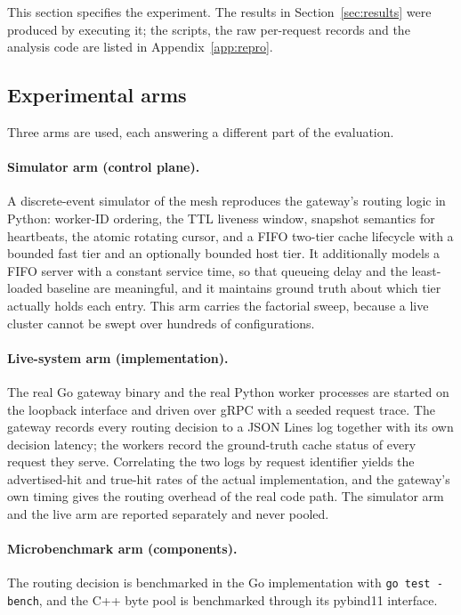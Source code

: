 \documentclass[10pt,twocolumn]{article}
\begin{document}
This section specifies the experiment. The results in
Section~\ref{sec:results} were produced by executing it; the scripts, the
raw per-request records and the analysis code are listed in
Appendix~\ref{app:repro}.

\subsection{Experimental arms}

Three arms are used, each answering a different part of the evaluation.

\paragraph{Simulator arm (control plane).} A discrete-event simulator of the
mesh reproduces the gateway's routing logic in Python: worker-ID ordering, the
TTL liveness window, snapshot semantics for heartbeats, the atomic rotating
cursor, and a FIFO two-tier cache lifecycle with a bounded fast tier and an
optionally bounded host tier. It additionally models a FIFO server with a
constant service time, so that queueing delay and the least-loaded baseline
are meaningful, and it maintains ground truth about which tier actually holds
each entry. This arm carries the factorial sweep, because a live cluster
cannot be swept over hundreds of configurations.

\paragraph{Live-system arm (implementation).} The real Go gateway binary and
the real Python worker processes are started on the loopback interface and
driven over gRPC with a seeded request trace. The gateway records every
routing decision to a JSON Lines log together with its own decision latency;
the workers record the ground-truth cache status of every request they serve.
Correlating the two logs by request identifier yields the advertised-hit and
true-hit rates of the actual implementation, and the gateway's own timing
gives the routing overhead of the real code path. The simulator arm and the
live arm are reported separately and never pooled.

\paragraph{Microbenchmark arm (components).} The routing decision is
benchmarked in the Go implementation with \texttt{go test -bench}, and the
C++ byte pool is benchmarked through its pybind11 interface.
\end{document}
